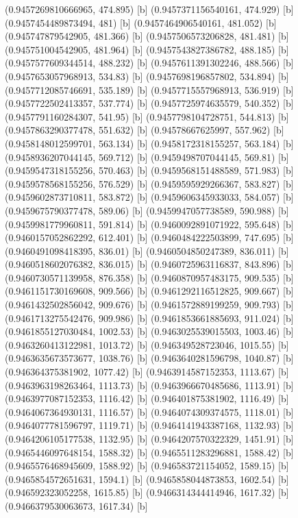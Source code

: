 {{{(0.9457269810666965, 474.895) [b] 
(0.9457371156540161, 474.929) [b] 
(0.9457454489873494, 481) [b] 
(0.9457464906540161, 481.052) [b] 
(0.945747879542905, 481.366) [b] 
(0.9457506573206828, 481.481) [b] 
(0.945751004542905, 481.964) [b] 
(0.9457543827386782, 488.185) [b] 
(0.9457577609344514, 488.232) [b] 
(0.9457611391302246, 488.566) [b] 
(0.9457653057968913, 534.83) [b] 
(0.9457698196857802, 534.894) [b] 
(0.9457712085746691, 535.189) [b] 
(0.9457715557968913, 536.919) [b] 
(0.9457722502413357, 537.774) [b] 
(0.9457725974635579, 540.352) [b] 
(0.9457791160284307, 541.95) [b] 
(0.9457798104728751, 544.813) [b] 
(0.9457863290377478, 551.632) [b] 
(0.94578667625997, 557.962) [b] 
(0.9458148012599701, 563.134) [b] 
(0.9458172318155257, 563.184) [b] 
(0.9458936207044145, 569.712) [b] 
(0.9459498707044145, 569.81) [b] 
(0.9459547318155256, 570.463) [b] 
(0.9459568151488589, 571.983) [b] 
(0.9459578568155256, 576.529) [b] 
(0.9459595929266367, 583.827) [b] 
(0.9459602873710811, 583.872) [b] 
(0.9459606345933033, 584.057) [b] 
(0.9459675790377478, 589.06) [b] 
(0.9459947057738589, 590.988) [b] 
(0.9459981779960811, 591.814) [b] 
(0.9460092891071922, 595.648) [b] 
(0.9460157052862292, 612.401) [b] 
(0.9460484222503899, 747.695) [b] 
(0.9460491098418395, 836.01) [b] 
(0.9460504850247389, 836.011) [b] 
(0.9460518602076382, 836.015) [b] 
(0.9460725963116837, 843.896) [b] 
(0.9460730571139958, 876.358) [b] 
(0.9460870957483175, 909.535) [b] 
(0.9461151730169608, 909.566) [b] 
(0.9461292116512825, 909.667) [b] 
(0.9461432502856042, 909.676) [b] 
(0.9461572889199259, 909.793) [b] 
(0.9461713275542476, 909.986) [b] 
(0.9461853661885693, 911.024) [b] 
(0.9461855127030484, 1002.53) [b] 
(0.9463025539015503, 1003.46) [b] 
(0.9463260413122981, 1013.72) [b] 
(0.946349528723046, 1015.55) [b] 
(0.9463635673573677, 1038.76) [b] 
(0.9463640281596798, 1040.87) [b] 
(0.946364375381902, 1077.42) [b] 
(0.9463914587152353, 1113.67) [b] 
(0.9463963198263464, 1113.73) [b] 
(0.9463966670485686, 1113.91) [b] 
(0.9463977087152353, 1116.42) [b] 
(0.946401875381902, 1116.49) [b] 
(0.9464067364930131, 1116.57) [b] 
(0.9464074309374575, 1118.01) [b] 
(0.9464077781596797, 1119.71) [b] 
(0.9464141943387168, 1132.93) [b] 
(0.9464206105177538, 1132.95) [b] 
(0.9464207570322329, 1451.91) [b] 
(0.9465446097648154, 1588.32) [b] 
(0.9465511283296881, 1588.42) [b] 
(0.9465576468945609, 1588.92) [b] 
(0.946583721154052, 1589.15) [b] 
(0.9465854572651631, 1594.1) [b] 
(0.9465858044873853, 1602.54) [b] 
(0.946592323052258, 1615.85) [b] 
(0.9466314344414946, 1617.32) [b] 
(0.9466379530063673, 1617.34) [b] 
}}}
